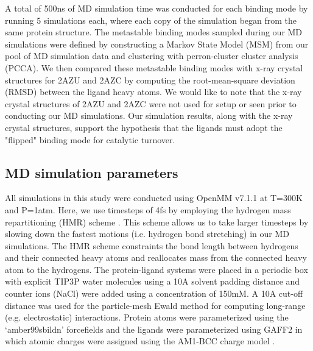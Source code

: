 A total of 500ns of MD simulation time was conducted for each binding mode by running 5 simulations each, where each copy of the simulation began from the same protein structure.
The metastable binding modes sampled during our MD simulations were defined by constructing a Markov State Model (MSM) from our pool of MD simulation data and clustering with perron-cluster cluster analysis (PCCA).
We then compared these metastable binding modes with x-ray crystal structures for 2AZU and 2AZC by computing the root-mean-square deviation (RMSD) between the ligand heavy atoms.
We would like to note that the x-ray crystal structures of 2AZU and 2AZC were not used for setup or seen prior to conducting our MD simulations.
Our simulation results, along with the x-ray crystal structures, support the hypothesis that the ligands must adopt the "flipped" binding mode for catalytic turnover.

\subsection{MD simulation parameters}
All simulations in this study were conducted using OpenMM v7.1.1 \cite{openmm} at T=300K and P=1atm.
Here, we use timesteps of 4fs by employing the hydrogen mass repartitioning (HMR) scheme \cite{hmr}. 
This scheme allows us to take larger timesteps by slowing down the fastest motions (i.e. hydrogen bond stretching) in our MD simulations.
The HMR scheme constraints the bond length between hydrogens and their connected heavy atoms and reallocates mass from the connected heavy atom to the hydrogens.
The protein-ligand systems were placed in a periodic box with explicit TIP3P water molecules using a 10A solvent padding distance and counter ions (NaCl) were added using a concentration of 150mM.
A 10A cut-off distance was used for the particle-mesh Ewald method for computing long-range (e.g. electrostatic) interactions.
Protein atoms were parameterized using the `amber99sbildn' forcefields \cite{amber99sbildn} and the ligands were parameterized using GAFF2 \cite{ambergaff} in which atomic charges were assigned using the AM1-BCC charge model \cite{am1bcc}.

